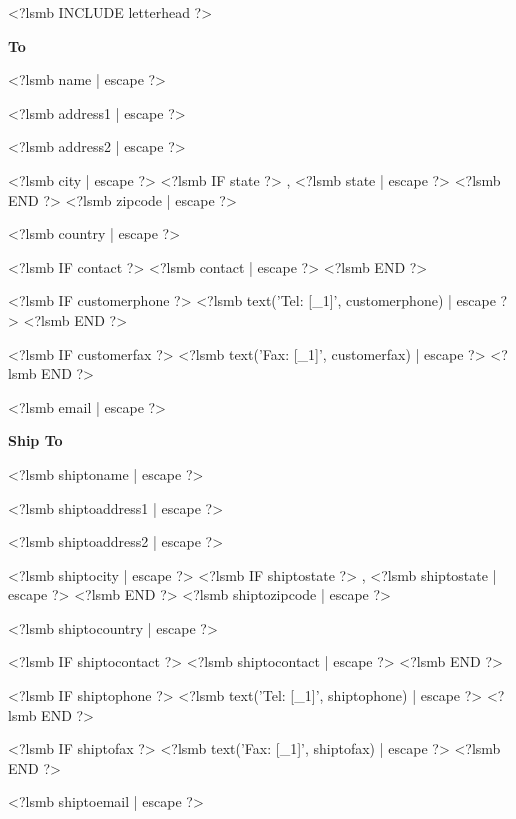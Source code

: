 \documentclass{scrartcl}
\begin{document}
\pagestyle{myheadings}
\thispagestyle{empty}

\fontsize{10pt}{12pt}\selectfont

<?lsmb INCLUDE letterhead ?>


%
%
%


\vspace*{0.5cm}

\parbox[t]{.5\textwidth}{
\textbf{To}
\vspace{0.3cm}

<?lsmb name | escape ?>

<?lsmb address1 | escape ?>

<?lsmb address2 | escape ?>

<?lsmb city | escape ?>
<?lsmb IF state ?>
\hspace{-0.1cm}, <?lsmb state | escape ?>
<?lsmb END ?>
<?lsmb zipcode | escape ?>

<?lsmb country | escape ?>

\vspace{0.3cm}

<?lsmb IF contact ?>
<?lsmb contact | escape ?>
\vspace{0.2cm}
<?lsmb END ?>

<?lsmb IF customerphone ?>
<?lsmb text('Tel: [_1]', customerphone) | escape ?>
<?lsmb END ?>

<?lsmb IF customerfax ?>
<?lsmb text('Fax: [_1]', customerfax) | escape ?>
<?lsmb END ?>

<?lsmb email | escape ?>
}
\parbox[t]{.5\textwidth}{
\textbf{Ship To}
\vspace{0.3cm}

<?lsmb shiptoname | escape ?>

<?lsmb shiptoaddress1 | escape ?>

<?lsmb shiptoaddress2 | escape ?>

<?lsmb shiptocity | escape ?>
<?lsmb IF shiptostate ?>
\hspace{-0.1cm}, <?lsmb shiptostate | escape ?>
<?lsmb END ?>
<?lsmb shiptozipcode | escape ?>

<?lsmb shiptocountry | escape ?>

\vspace{0.3cm}

<?lsmb IF shiptocontact ?>
<?lsmb shiptocontact | escape ?>
\vspace{0.2cm}
<?lsmb END ?>

<?lsmb IF shiptophone ?>
<?lsmb text('Tel: [_1]', shiptophone) | escape ?>
<?lsmb END ?>

<?lsmb IF shiptofax ?>
<?lsmb text('Fax: [_1]', shiptofax) | escape ?>
<?lsmb END ?>

<?lsmb shiptoemail | escape ?>
}
\hfill
\end{document}
